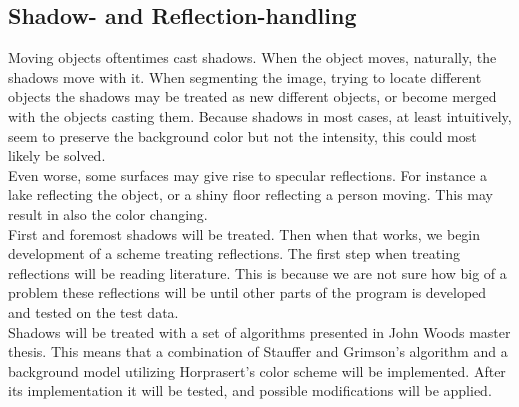 \subsection{Shadow- and Reflection-handling}
Moving objects oftentimes cast shadows. When the object moves, naturally, the shadows move with it. When segmenting the image, trying to locate different objects the shadows may be treated as new different objects, or become merged with the objects casting them. Because shadows in most cases, at least intuitively, seem to preserve the background color but not the intensity, this could most likely be solved.\\

Even worse, some surfaces may give rise to specular reflections. For instance a lake reflecting the object, or a shiny floor reflecting a person moving. This may result in also the color changing.\\

First and foremost shadows will be treated. Then when that works, we begin development of a scheme treating reflections. The first step when treating reflections will be reading literature. This is because we are not sure how big of a problem these reflections will be until other parts of the program is developed and tested on the test data.\\

Shadows will be treated with a set of algorithms presented in John Woods master thesis. This means that a combination of Stauffer and Grimson's algorithm and a background model utilizing Horprasert's color scheme will be implemented. After its implementation it will be tested, and possible modifications will be applied.\\
